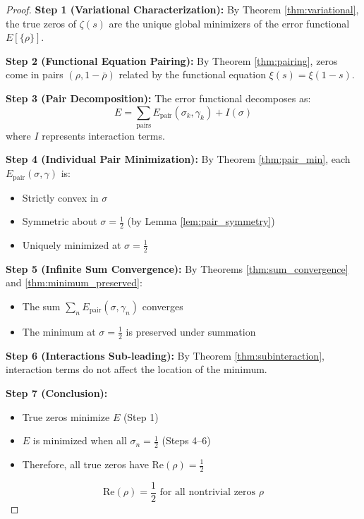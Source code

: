 \documentclass[12pt,a4paper]{article}
\theoremstyle{definition}
\theoremstyle{remark}
\newcommand{\Epair}{E_{\text{pair}}}
\newcommand{\half}{\tfrac{1}{2}}
\begin{document}
\begin{proof}
\textbf{Step 1 (Variational Characterization):}
By Theorem \ref{thm:variational}, the true zeros of $\zeta(s)$ are the unique global minimizers of the error functional $E[\{\rho\}]$.

\textbf{Step 2 (Functional Equation Pairing):}
By Theorem \ref{thm:pairing}, zeros come in pairs $(\rho, 1-\bar{\rho})$ related by the functional equation $\xi(s) = \xi(1-s)$.

\textbf{Step 3 (Pair Decomposition):}
The error functional decomposes as:
\begin{equation}
E = \sum_{\text{pairs}} \Epair(\sigma_k, \gamma_k) + I(\sigma)
\end{equation}
where $I$ represents interaction terms.

\textbf{Step 4 (Individual Pair Minimization):}
By Theorem \ref{thm:pair_min}, each $\Epair(\sigma, \gamma)$ is:
\begin{itemize}
    \item Strictly convex in $\sigma$
    \item Symmetric about $\sigma = \half$ (by Lemma \ref{lem:pair_symmetry})
    \item Uniquely minimized at $\sigma = \half$
\end{itemize}

\textbf{Step 5 (Infinite Sum Convergence):}
By Theorems \ref{thm:sum_convergence} and \ref{thm:minimum_preserved}:
\begin{itemize}
    \item The sum $\sum_n \Epair(\sigma, \gamma_n)$ converges
    \item The minimum at $\sigma = \half$ is preserved under summation
\end{itemize}

\textbf{Step 6 (Interactions Sub-leading):}
By Theorem \ref{thm:subinteraction}, interaction terms do not affect the location of the minimum.

\textbf{Step 7 (Conclusion):}
\begin{itemize}
    \item True zeros minimize $E$ (Step 1)
    \item $E$ is minimized when all $\sigma_n = \half$ (Steps 4--6)
    \item Therefore, all true zeros have $\text{Re}(\rho) = \half$
\end{itemize}

\begin{equation}
\boxed{\text{Re}(\rho) = \frac{1}{2} \text{ for all nontrivial zeros } \rho}
\end{equation}
\end{proof}
\end{document}
